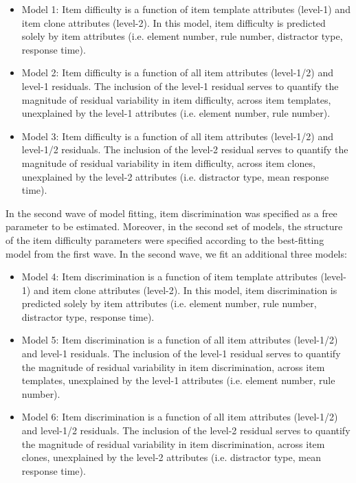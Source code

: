 \documentclass[a4paper,man,natbib,noextraspace]{apa6}
\begin{document}
\begin{itemize}

    \item Model 1: Item difficulty is a function of item template attributes (level-1) and item clone attributes (level-2). In this model, item difficulty is predicted solely by item attributes (i.e. element number, rule number, distractor type, response time). 

    \item Model 2: Item difficulty is a function of all item attributes (level-1/2) and level-1 residuals. The inclusion of the level-1 residual serves to quantify the magnitude of residual variability in item difficulty, across item templates, unexplained by the level-1 attributes (i.e. element number, rule number).

    \item Model 3: Item difficulty is a function of all item attributes (level-1/2) and level-1/2 residuals. The inclusion of the level-2 residual serves to quantify the magnitude of residual variability in item difficulty, across item clones, unexplained by the level-2 attributes (i.e. distractor type, mean response time).

\end{itemize}

In the second wave of model fitting, item discrimination was specified as a free parameter to be estimated. Moreover, in the second set of models, the structure of the item difficulty parameters were specified according to the best-fitting model from the first wave. In the second wave, we fit an additional three models:

\begin{itemize}

    \item Model 4: Item discrimination is a function of item template attributes (level-1) and item clone attributes (level-2). In this model, item discrimination is predicted solely by item attributes (i.e. element number, rule number, distractor type, response time). 
    
    \item Model 5: Item discrimination is a function of all item attributes (level-1/2) and level-1 residuals. The inclusion of the level-1 residual serves to quantify the magnitude of residual variability in item discrimination, across item templates, unexplained by the level-1 attributes (i.e. element number, rule number).
    
    \item Model 6: Item discrimination is a function of all item attributes (level-1/2) and level-1/2 residuals. The inclusion of the level-2 residual serves to quantify the magnitude of residual variability in item discrimination, across item clones, unexplained by the level-2 attributes (i.e. distractor type, mean response time).
    
\end{itemize}
\end{document}
